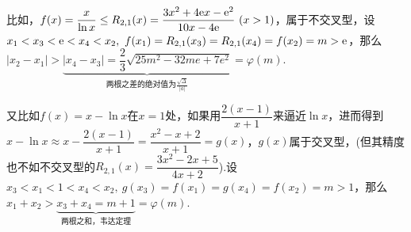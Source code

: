 \begin{itemize}[leftmargin=\inteval{\myitemleftmargin}pt,itemsep=
   \inteval{\myitemitempsep}pt,topsep=\inteval{\myitemtopsep}pt]
比如，$ f(x)=\dfrac{x}{\ln x}\leq R_{2,1}(x)=\dfrac{3x^2+4\e x-\e^2}{10x-4\e}\ (x>1) $，属于不交叉型，设$ x_1<x_3<\e<x_4<x_2,\ f(x_1)=R_{2,1}(x_3)=R_{2,1}(x_4)=f(x_2)=m>\e $，那么$ |x_2-x_1|>\underbrace{|x_4-x_3|=\dfrac{2}{3}\sqrt{25m^2-32me+7e^2}}_{\text{两根之差的绝对值为}\frac{\sqrt{\Delta}}{|a|}}=\varphi(m) $. 

又比如$ f(x)=x-\ln x $在$ x=1 $处，如果用$ \dfrac{2(x-1)}{x+1} $来逼近$ \ln x $，进而得到$ x-\ln x \approx x-\dfrac{2(x-1)}{x+1}=\dfrac{x^2-x+2}{x+1}=g(x) $，$ g(x) $属于交叉型，(但其精度也不如不交叉型的$ R_{2,1}(x)=\dfrac{3x^2-2x+5}{4x+2} $).设$ x_3<x_1<1<x_4<x_2,\ g(x_3)=f(x_1)=g(x_4)=f(x_2)=m>1 $，那么$ x_1+x_2>\underbrace{x_3+x_4=m+1}_{\text{两根之和，韦达定理}}=\varphi(m) $. 

\end{itemize}

